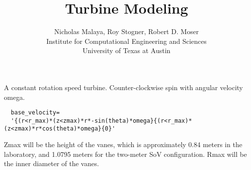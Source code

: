 \documentclass{article}
\title{\bf{Turbine Modeling}}
\author{Nicholas Malaya, Roy Stogner, Robert D. Moser \\ Institute for Computational Engineering and Sciences \\ University of Texas at Austin} \date{}
\begin{document}
\maketitle

\newpage

A constant rotation speed turbine. Counter-clockwise spin with angular velocity omega. 

\begin{verbatim}
  base_velocity=
  '{(r<r_max)*(z<zmax)*r*-sin(theta)*omega}{(r<r_max)*(z<zmax)*r*cos(theta)*omega}{0}'
\end{verbatim}

Zmax will be the height of the vanes, which is approximately 0.84 meters in the laboratory, 
and 1.0795 meters for the two-meter SoV configuration. Rmax will be the inner diameter of the vanes. 
\end{document}
